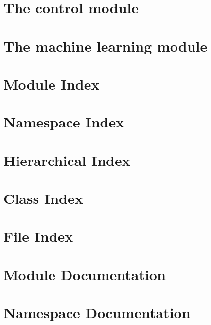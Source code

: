 \documentclass[twoside]{book}
\begin{document}
\chapter{The control module}
\label{controlpage}
\hypertarget{controlpage}{}

\chapter{The machine learning module}
\label{mlpage}
\hypertarget{mlpage}{}

\chapter{Module Index}

\chapter{Namespace Index}

\chapter{Hierarchical Index}

\chapter{Class Index}

\chapter{File Index}

\chapter{Module Documentation}




\chapter{Namespace Documentation}

\end{document}
